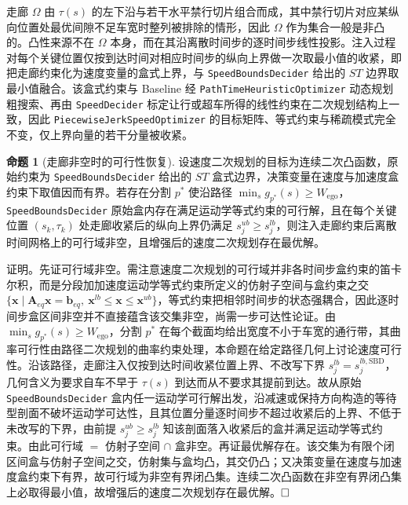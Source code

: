 \documentclass[a4paper,11pt]{ctexart}
\theoremstyle{definition}
\newtheorem{proposition}{命题}[section]
\begin{document}
走廊 $\Omega$ 由 $\tau(s)$ 的左下沿与若干水平禁行切片组合而成，其中禁行切片对应某纵向位置处最优间隙不足车宽时整列被排除的情形，因此 $\Omega$ 作为集合一般是非凸的。凸性来源不在 $\Omega$ 本身，而在其沿离散时间步的逐时间步线性投影。注入过程对每个关键位置仅按到达时间对相应时间步的纵向上界做一次取最小值的收紧，即把走廊约束化为速度变量的盒式上界，与 \texttt{SpeedBoundsDecider} 给出的 $ST$ 边界取最小值融合。该盒式约束与 Baseline 经 \texttt{PathTimeHeuristicOptimizer} 动态规划粗搜索、再由 \texttt{SpeedDecider} 标定让行或超车所得的线性约束在二次规划结构上一致，因此 \texttt{PiecewiseJerkSpeedOptimizer} 的目标矩阵、等式约束与稀疏模式完全不变，仅上界向量的若干分量被收紧。

\begin{proposition}[走廊非空时的可行性恢复]
\label{prop:feasibility_recovery}
设速度二次规划的目标为连续二次凸函数，原始约束为 \texttt{SpeedBoundsDecider} 给出的 $ST$ 盒式边界，决策变量在速度与加速度盒约束下取值因而有界。若存在分割 $p^{*}$ 使沿路径 $\min_s g_{p^{*}}(s) \geq W_{\text{ego}}$，\texttt{SpeedBoundsDecider} 原始盒内存在满足运动学等式约束的可行解，且在每个关键位置 $(s_k, \tau_k)$ 处走廊收紧后的纵向上界仍满足 $s_j^{ub} \geq s_j^{lb}$，则注入走廊约束后离散时间网格上的可行域非空，且增强后的速度二次规划存在最优解。
\end{proposition}

证明。先证可行域非空。需注意速度二次规划的可行域并非各时间步盒约束的笛卡尔积，而是分段加加速度运动学等式约束所定义的仿射子空间与盒约束之交 $\{\mathbf{x}\mid \mathbf{A}_{eq}\mathbf{x}=\mathbf{b}_{eq},\ \mathbf{x}^{lb}\le\mathbf{x}\le\mathbf{x}^{ub}\}$，等式约束把相邻时间步的状态强耦合，因此逐时间步盒区间非空并不直接蕴含该交集非空，尚需一步可达性论证。由 $\min_s g_{p^{*}}(s) \geq W_{\text{ego}}$，分割 $p^{*}$ 在每个截面均给出宽度不小于车宽的通行带，其曲率可行性由路径二次规划的曲率约束处理，本命题在给定路径几何上讨论速度可行性。沿该路径，走廊注入仅按到达时间收紧位置上界、不改写下界 $s_j^{lb}=s_j^{lb,\mathrm{SBD}}$，几何含义为要求自车不早于 $\tau(s)$ 到达而从不要求其提前到达。故从原始 \texttt{SpeedBoundsDecider} 盒内任一运动学可行解出发，沿减速或保持方向构造的等待型剖面不破坏运动学可达性，且其位置分量逐时间步不超过收紧后的上界、不低于未改写的下界，由前提 $s_j^{ub} \geq s_j^{lb}$ 知该剖面落入收紧后的盒并满足运动学等式约束。由此可行域 $=$ 仿射子空间 $\cap$ 盒非空。再证最优解存在。该交集为有限个闭区间盒与仿射子空间之交，仿射集与盒均凸，其交仍凸；又决策变量在速度与加速度盒约束下有界，故可行域为非空有界闭凸集。连续二次凸函数在非空有界闭凸集上必取得最小值，故增强后的速度二次规划存在最优解。$\hfill\Box$
\end{document}
